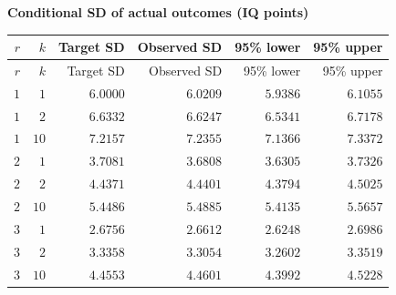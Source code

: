 
\begingroup\small
\setlength{\tabcolsep}{4pt}
\noindent\textbf{Conditional SD of actual outcomes (IQ points)}
\begin{longtable}{rrrrrr}
\toprule
$r$ & $k$ & Target SD & Observed SD & 95\% lower & 95\% upper \\
\midrule
\endfirsthead
$r$ & $k$ & Target SD & Observed SD & 95\% lower & 95\% upper \\
\midrule
\endhead
\bottomrule
\endfoot
$1$ & $1$ & $6.0000$ & $6.0209$ & $5.9386$ & $6.1055$ \\
$1$ & $2$ & $6.6332$ & $6.6247$ & $6.5341$ & $6.7178$ \\
$1$ & $10$ & $7.2157$ & $7.2355$ & $7.1366$ & $7.3372$ \\
$2$ & $1$ & $3.7081$ & $3.6808$ & $3.6305$ & $3.7326$ \\
$2$ & $2$ & $4.4371$ & $4.4401$ & $4.3794$ & $4.5025$ \\
$2$ & $10$ & $5.4486$ & $5.4885$ & $5.4135$ & $5.5657$ \\
$3$ & $1$ & $2.6756$ & $2.6612$ & $2.6248$ & $2.6986$ \\
$3$ & $2$ & $3.3358$ & $3.3054$ & $3.2602$ & $3.3519$ \\
$3$ & $10$ & $4.4553$ & $4.4601$ & $4.3992$ & $4.5228$ \\
\end{longtable}
\endgroup

